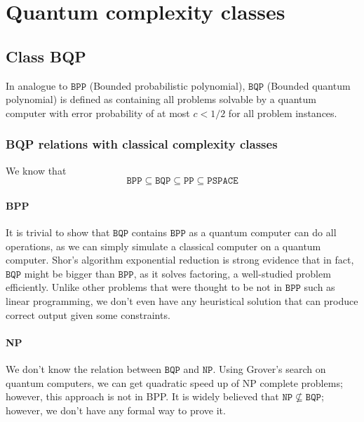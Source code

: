 \section{Quantum complexity classes}
\subsection{Class BQP}
In analogue to $\mathtt{BPP}$ (Bounded probabilistic polynomial), $\mathtt{BQP}$ (Bounded quantum polynomial) is defined as containing all problems solvable by a quantum computer with error probability of at most $c<1/2$ for all problem instances. 
\subsubsection{BQP relations with classical complexity classes}
We know that 
$$\mathtt{BPP} \subseteq \mathtt{BQP} \subseteq \mathtt{PP} \subseteq \mathtt{PSPACE}$$ 
\paragraph{BPP}
It is trivial to show that $\mathtt{BQP}$ contains $\mathtt{BPP}$ as a quantum computer can do all operations, as we can simply simulate a classical computer on a quantum computer. Shor's algorithm exponential reduction is strong evidence that in fact, $\mathtt{BQP}$ might be bigger than $\mathtt{BPP}$, as it solves factoring, a well-studied problem efficiently. Unlike other problems that were thought to be not in $\mathtt{BPP}$ such as linear programming, we don't even have any heuristical solution that can produce correct output given some constraints.  
\paragraph{NP}
We don't know the relation between $\mathtt{BQP}$ and $\mathtt{NP}$. Using Grover's search on quantum computers, we can get quadratic speed up of NP complete problems; however, this approach is not in BPP. It is widely believed that $\mathtt{NP} \nsubseteq \mathtt{BQP}$; however, we don't have any formal way to prove it. 
